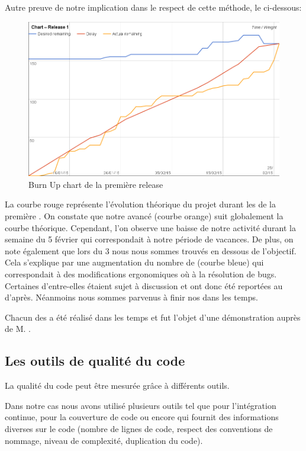 Autre preuve de notre implication dans le respect de cette méthode, le \BurnUp{} ci-dessous: 
\begin{figure}[H]
	\centering
	\includegraphics[width=14cm]{screens/release1-chart.png}
	\caption{Burn Up chart de la première release}
	\label{fig:burnupchart-release1}
\end{figure}
La courbe rouge représente l'évolution théorique du projet durant les \Sprints{} de la première \Release. On constate que notre avancé (courbe orange)  suit globalement la courbe théorique. Cependant, l'on observe une baisse de notre activité durant la semaine du 5 février qui correspondait à notre période de vacances. De plus, on note également que lors du \Sprint{} 3 nous nous sommes trouvés en dessous de l'objectif. Cela s'explique par une augmentation du nombre de \Stories{} (courbe bleue) qui correspondait à des modifications ergonomiques où à la résolution de bugs. Certaines d'entre-elles étaient sujet à discussion et ont donc été reportées au \Sprint{} d'après. Néanmoins nous sommes parvenus à finir nos \Sprints{} dans les temps. 

Chacun des \Sprints{} a été réalisé dans les temps et fut l'objet d'une démonstration auprès de M. . 

\subsection{Les outils de qualité du code}
La qualité du code peut être mesurée grâce à différents outils. 

Dans notre cas nous avons utilisé plusieurs outils tel que \Travis{} pour l'intégration continue, \Coveralls{} pour la couverture de code ou encore \SonarQube{} qui fournit des informations diverses sur le code (nombre de lignes de code, respect des conventions de nommage, niveau de complexité, duplication du code). 

